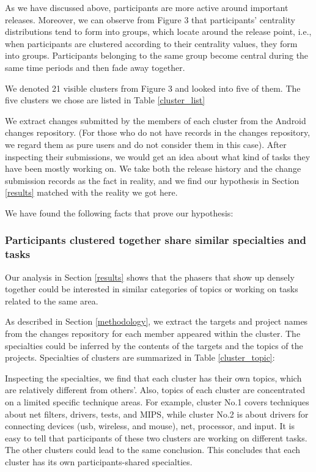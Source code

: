 \documentclass[10pt, conference, compsocconf]{IEEEtran}
\begin{document}
As we have discussed above, participants are more active around important releases. Moreover, we can observe from Figure 3 that participants' centrality distributions tend to form into groups, which locate around the release point, i.e., when participants are clustered according to their centrality values, they form into groups. Participants belonging to the same group become central during the same time periods and then fade away together.

We denoted 21 visible clusters from Figure 3 and looked into five of them. 
The five clusters we chose are listed in Table \ref{cluster_list}

We extract changes submitted by the members of each cluster from the Android changes repository. (For those who do not have records in the changes repository, we regard them as pure users and do not consider them in this case). After inspecting their submissions, we would get an idea about what kind of tasks they have been mostly working on.
We take both the release history and the change submission records as the fact in reality, and we find our hypothesis in Section \ref{results} matched with the reality we got here. 

We have found the following facts that prove our hypothesis:

\subsubsection{Participants clustered together share similar specialties and tasks}

Our analysis in Section \ref{results} shows that the phasers that show up densely together could be interested in similar categories of topics or working on tasks related to the same area.

As described in Section \ref{methodology}, we extract the targets and project names from the changes repository for each member appeared within the cluster. The specialties could be inferred by the contents of the targets and the topics of the projects. Specialties of clusters are summarized in Table \ref{cluster_topic}:


Inspecting the specialties, we find that each cluster has their own topics, which are relatively different from others'. Also, topics of each cluster are concentrated on a limited specific technique areas. For example, cluster No.1 covers techniques about net filters, drivers, tests, and MIPS, while cluster No.2 is about drivers for connecting devices (usb, wireless, and mouse), net, processor, and input. It is easy to tell that participants of these two clusters are working on different tasks. The other clusters could lead to the same conclusion. This concludes that each cluster has its own participants-shared specialties.
\end{document}
